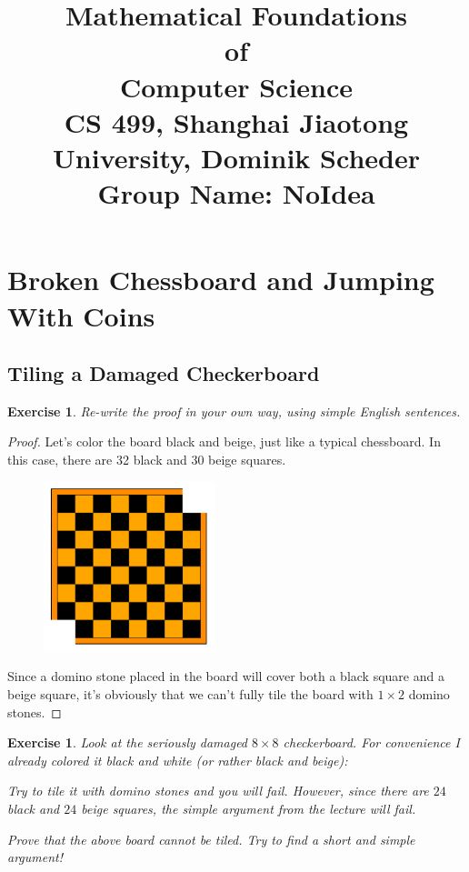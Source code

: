 \documentclass[12pt,a4]{article}
\date{}
\title{
	Mathematical Foundations \\of \\Computer Science\\
	\vspace{3mm}
	{\normalsize CS 499,	Shanghai Jiaotong University,  Dominik Scheder\\}
	{\normalsize Group Name: \textbf{NoIdea}}
}
\theoremstyle{exercise}
\newtheorem{exercise}[theorem]{Exercise}
\begin{document}
\maketitle

\section{Broken Chessboard and Jumping With Coins}

\subsection{Tiling a Damaged Checkerboard}

\begin{exercise}
    Re-write the proof in your own way,  using simple English sentences.
\end{exercise}

\begin{proof}
	Let's color the board black and beige, just like a typical chessboard.
    In this case, there are 32 black and 30 beige squares.

    \begin{figure}[h]
        \small
        \centering
        \includegraphics[width=5cm]{slightlydamaged.png}
        \label{fig:slightlyDamagedBoard}
    \end{figure}

    Since a domino stone placed in the board will cover both a black square and a beige square,
    it's obviously that we can't fully tile the board with $1 \times 2$ domino stones.

\end{proof}

\begin{exercise}
    Look at the seriously damaged $8 \times 8$ checkerboard.
    For convenience I already colored it black and white (or rather black and beige):

    Try to tile it with domino stones and you will fail.
    However, since there are $24$ black and $24$ beige squares, the simple argument from the lecture will fail.

    Prove that the above board cannot be tiled. Try to ﬁnd a short and simple argument!
\end{exercise}
\end{document}
